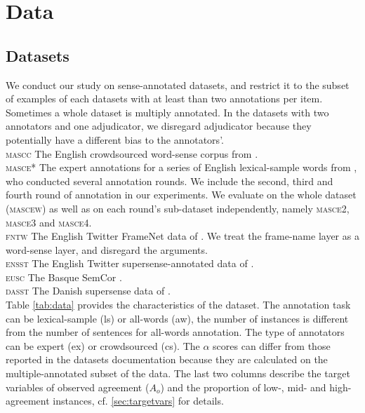 \documentclass[11pt,a4paper]{article}
\begin{document}
\section{Data}
\subsection{Datasets}

We conduct our study on sense-annotated datasets, and restrict it to the subset of examples of each datasets with at least than two annotations per item. Sometimes a whole dataset is multiply annotated. In the datasets with two annotators and one adjudicator, we disregard adjudicator because they potentially have a different bias to the annotators'.\\
\noindent\textsc{mascc} The English crowdsourced word-sense corpus from .\\
\textsc{masce*} The expert annotations for a series of English lexical-sample words from , who conducted several annotation rounds. We include the second, third and fourth round of annotation in our experiments. We evaluate on the whole dataset (\textsc{mascew}) as well as on each round's sub-dataset independently, namely \textsc{masce2}, \textsc{masce3} and \textsc{masce4}.\\
\textsc{fntw} The English Twitter FrameNet data of . We treat the frame-name layer as a word-sense layer, and disregard the arguments.\\
\textsc{ensst} The English Twitter supersense-annotated data of .\\
\textsc{eusc} The Basque SemCor \cite{Agirre2006}.\\
\textsc{dasst} The Danish supersense data of \cite{MartinezAlonso2015}.\\
Table \ref{tab:data} provides the characteristics of the dataset. The annotation task can be lexical-sample (ls) or all-words (aw), the number of instances is different from the number of sentences for all-words annotation. The type of annotators can be expert (ex) or crowdsourced (cs). The $\alpha$ \cite{Artstein2008} scores can differ from those reported in the datasets documentation because they are calculated on the multiple-annotated subset of the data. The last two columns describe the target variables of observed agreement ($A_o$) and the proportion of low-, mid- and high-agreement instances, cf. \ref{sec:targetvars} for details.
\end{document}
